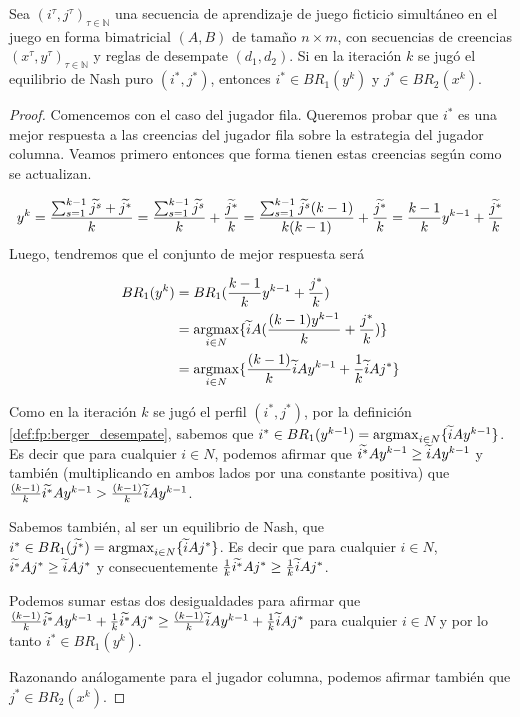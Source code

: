 \begin{lemma}
    Sea $(i^\tau, j^\tau)_{\tau \in \mathbb{N}}$ una secuencia de aprendizaje de juego ficticio simultáneo en el juego en forma bimatricial $(A, B)$ de tamaño $n \times m$, con secuencias de creencias $(x^\tau, y^\tau)_{\tau \in \mathbb{N}}$ y reglas de desempate $(d_1, d_2)$. Si en la iteración $k$ se jugó el equilibrio de Nash puro $(i^*, j^*)$, entonces $i^* \in BR_1(y^{k})$ y $j^* \in BR_2(x^{k})$.
\end{lemma}
\begin{proof}

    Comencemos con el caso del jugador fila. Queremos probar que $i^*$ es una mejor respuesta a las creencias del jugador fila sobre la estrategia del jugador columna. Veamos primero entonces que forma tienen estas creencias según como se actualizan.
    
    \[
        y^k = \frac{\sum_{s=1}^{k-1}{\widetilde{j^s}} + \widetilde{j^*}}{k}
            = \frac{\sum_{s=1}^{k-1}{\widetilde{j^s}}}{k} + \frac{\widetilde{j^*}}{k}
            = \frac{\sum_{s=1}^{k-1}{\widetilde{j^s}}(k-1)}{k(k-1)} + \frac{\widetilde{j^*}}{k}
            = \frac{k - 1}{k} y^{k-1} + \frac{\widetilde{j^*}}{k}
    \]
    Luego, tendremos que el conjunto de mejor respuesta será
    
    \begin{align*}
        BR_1(y^k) &= BR_1(\frac{k - 1}{k} y^{k-1} + \frac{j^*}{k}) \\
        &= \operatorname*{argmax}_{i \in N} \{\widetilde{i} A(\frac{(k - 1)y^{k-1}}{k} + \frac{j^*}{k})\}\\
        &= \operatorname*{argmax}_{i \in N} \{\frac{(k - 1)}{k}\widetilde{i} Ay^{k-1} + \frac{1}{k}\widetilde{i} Aj^*\}
    \end{align*}

    Como en la iteración $k$ se jugó el perfil $(i^*, j^*)$, por la definición \ref{def:fp:berger_desempate}, sabemos que $i^* \in BR_1(y^{k-1}) = \operatorname*{argmax}_{i \in N}\{\widetilde{i}Ay^{k-1}\}$. Es decir que para cualquier $i \in N$, podemos afirmar que $\widetilde{i^*}Ay^{k-1} \geq \widetilde{i}Ay^{k-1}$ y también (multiplicando en ambos lados por una constante positiva) que $\frac{(k - 1)}{k}\widetilde{i^*}Ay^{k-1} > \frac{(k - 1)}{k}\widetilde{i}Ay^{k-1}$.

    Sabemos también, al ser un equilibrio de Nash, que $i^* \in BR_1(\widetilde{j^*}) = \operatorname*{argmax}_{i \in N}\{\widetilde{i}Aj^*\}$. Es decir que para cualquier $i \in N$, $\widetilde{i^*}Aj^* \geq \widetilde{i}Aj^*$ y consecuentemente $\frac{1}{k}\widetilde{i^*}Aj^* \geq \frac{1}{k}\widetilde{i}Aj^*$.

    Podemos sumar estas dos desigualdades para afirmar que $\frac{(k - 1)}{k}\widetilde{i^*}Ay^{k-1} + \frac{1}{k}\widetilde{i^*}Aj^* \geq \frac{(k - 1)}{k}\widetilde{i}Ay^{k-1} + \frac{1}{k}\widetilde{i}Aj^*$ para cualquier $i \in N$ y por lo tanto $i^* \in BR_1(y^{k})$.

    Razonando análogamente para el jugador columna, podemos afirmar también que $j^* \in BR_2(x^{k})$.
    
\end{proof}

